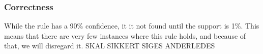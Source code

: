 \subsubsection{Correctness}
\label{Res_FP_Cor}

While the rule has a 90\% confidence, it it not found until the support is 1\%. This means that there are very few instances where this rule holds, and because of that, we will disregard it. SKAL SIKKERT SIGES ANDERLEDES